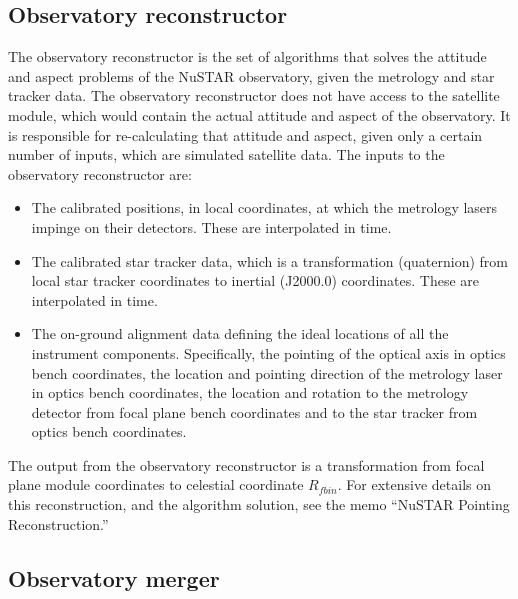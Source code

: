 \subsection{Observatory reconstructor}
The observatory reconstructor is the set of algorithms that solves the attitude and aspect problems of the NuSTAR observatory, given the metrology and star tracker data. The observatory reconstructor does not have access to the satellite module, which would contain the actual attitude and aspect of the observatory. It is responsible for re-calculating that attitude and aspect, given only a certain number of inputs, which are simulated satellite data.
The inputs to the observatory reconstructor are:
\begin{itemize}
\item The calibrated positions, in local coordinates, at which the metrology lasers impinge on their detectors. These are interpolated in time.
\item The calibrated star tracker data, which is a transformation (quaternion) from local star tracker coordinates to inertial (J2000.0) coordinates. These are interpolated in time. 
\item The on-ground alignment data defining the ideal locations of all the instrument components. Specifically, the pointing of the optical axis in optics bench coordinates, the location and pointing direction of the metrology laser in optics bench coordinates, the location and rotation to the metrology detector from focal plane bench coordinates and to the star tracker from optics bench coordinates.
\end{itemize}
The output from the observatory reconstructor is a transformation from focal plane module coordinates to celestial coordinate $R_{fbin}$.
For extensive details on this reconstruction, and the algorithm solution, see the memo “NuSTAR Pointing Reconstruction.”


\subsection{Observatory merger}
